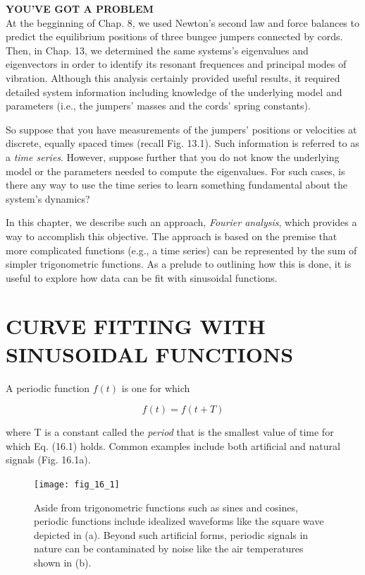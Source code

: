 \documentclass[../main.tex]{subfiles}
\begin{document}
\noindent\textbf{YOU'VE GOT A PROBLEM}\\

\noindent At the begginning of Chap. 8, we used Newton's second law and force balances to predict the equilibrium positions of three bungee jumpers connected by cords. Then, in Chap. 13, we determined the same systems's eigenvalues and eigenvectors in order to identify its resonant frequences and principal modes of vibration.
Although this analysis certainly provided useful results, it required detailed system information including
knowledge of the underlying model and parameters (i.e., the jumpers' masses and the
cords' spring constants).

So suppose that you have measurements of the jumpers' positions or velocities at discrete, equally spaced times (recall Fig. 13.1). Such information is referred to as a \textit{time series}. However, suppose further that you do not know the underlying model or the parameters needed to compute the eigenvalues. For such cases, is there any way to use the time
series to learn something fundamental about the system's dynamics?

In this chapter, we describe such an approach, \textit{Fourier analysis}, which provides a way to accomplish this objective. The approach is based on the premise that more complicated functions (e.g., a time series) can be represented by the sum of simpler trigonometric functions. As a prelude to outlining how this is done, it is useful to explore how data can be fit
with sinusoidal functions.

\label{cha:cha_P_16_1}
\section{CURVE FITTING WITH SINUSOIDAL FUNCTIONS}

\noindent A periodic function $f(t)$ is one for which

\begin{equation}
	\tag{16.1}
	f(t) = f(t + T)
\end{equation}

\noindent where T is a constant called the \textit{period} that is the smallest value of time for which Eq. (16.1) holds. Common examples include both artificial and natural signals (Fig. 16.1a).

\begin{figure}[H]
	\centering
	\texttt{[image: fig\_16\_1]}
	\caption{\textsf{Aside from trigonometric functions such as sines and cosines, periodic functions include
	idealized waveforms like the square wave depicted in (a). Beyond such artificial forms, periodic
	signals in nature can be contaminated by noise like the air temperatures shown in (b).}}
	\label{fig:fig_16_1}
\end{figure}
\end{document}

